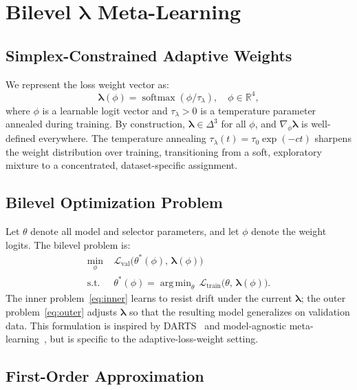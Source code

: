 \documentclass[lettersize,journal]{IEEEtran}
\newcommand{\R}{\mathbb{R}}
\newcommand{\softmax}{\operatorname{softmax}}
\newcommand{\calL}{\mathcal{L}}
\newcommand{\lambdavec}{\boldsymbol{\lambda}}
\DeclareMathOperator*{\argmin}{arg\,min}
\begin{document}
\section{Bilevel $\lambdavec$ Meta-Learning}
\label{sec:bilevel}

\subsection{Simplex-Constrained Adaptive Weights}

We represent the loss weight vector as:
\begin{equation}
  \lambdavec(\phi) = \softmax\!\left(\phi / \tau_\lambda\right),
  \quad \phi \in \R^4,
  \label{eq:simplex}
\end{equation}
where $\phi$ is a learnable logit vector and $\tau_\lambda > 0$
is a temperature parameter annealed during training.
By construction, $\lambdavec \in \Delta^3$ for all $\phi$,
and $\nabla_\phi \lambdavec$ is well-defined everywhere.
The temperature annealing $\tau_\lambda(t) = \tau_0 \exp(-ct)$
sharpens the weight distribution over training, transitioning
from a soft, exploratory mixture to a concentrated, dataset-specific
assignment.

\subsection{Bilevel Optimization Problem}

Let $\theta$ denote all model and selector parameters,
and let $\phi$ denote the weight logits.
The bilevel problem is:
\begin{align}
  \min_\phi \;&
  \calL_{\text{val}}\!\bigl(\theta^*(\phi),\, \lambdavec(\phi)\bigr)
  \label{eq:outer}\\
  \text{s.t.}\;&
  \theta^*(\phi) = \argmin_\theta\,
  \calL_{\text{train}}\!\bigl(\theta,\, \lambdavec(\phi)\bigr).
  \label{eq:inner}
\end{align}
The inner problem~\eqref{eq:inner} learns to resist drift
under the current $\lambdavec$; the outer problem~\eqref{eq:outer}
adjusts $\lambdavec$ so that the resulting model generalizes on
validation data.
This formulation is inspired by DARTS~\cite{liu2019darts} and
model-agnostic meta-learning~\cite{finn2017maml}, but is specific
to the adaptive-loss-weight setting.

\subsection{First-Order Approximation}
\end{document}
